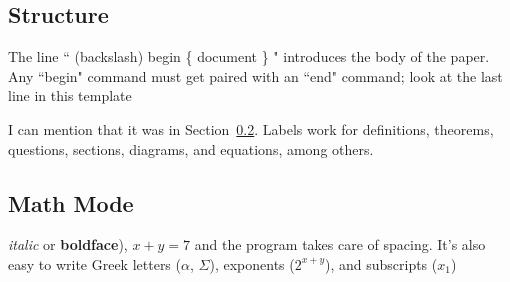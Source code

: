 \documentclass[11pt]{article}
\theoremstyle{plain}
\theoremstyle{definition}
\begin{document}
  \subsection{Structure}
   The  line `` (backslash) begin \{ document \} "  introduces the body of the paper.  Any ``begin" command must get paired with an ``end" command; look at the last line in this template

   I can mention that it was in Section~\ref{section:mathmode}. Labels work for definitions, theorems, questions, sections, diagrams, and equations, among others.

  \subsection{Math Mode}\label{section:mathmode}
   \textit{italic} or \textbf{boldface}),  $x+ y=7$ and the program takes care of spacing.  It's also easy to write Greek letters ($\alpha$, $\Sigma$), exponents ($2^{x+y}$), and subscripts ($x_1$)

   \renewcommand{\refname}{Lähteet}
   
   

  
\end{document}

